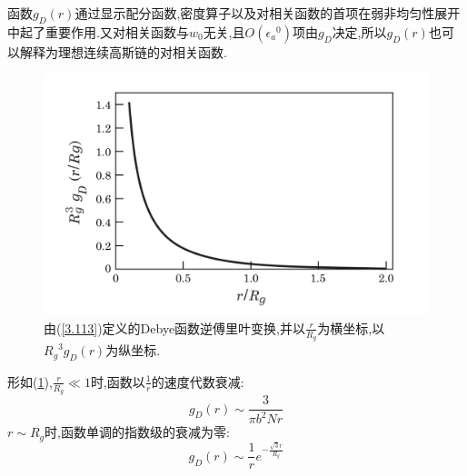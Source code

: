 函数$g_D(r)$通过显示配分函数,密度算子以及对相关函数的首项在弱非均匀性展开中起了重要作用.又对相关函数与$w_0$无关,且$O({\epsilon_a}^0)$项由$g_D$决定,所以$g_D(r)$也可以解释为理想连续高斯链的对相关函数.
\begin{figure}[H]
	\centering
	\includegraphics[scale=0.4]{./figures/FIG3-9.png}
	\caption{由(\ref{3.113})定义的Debye函数逆傅里叶变换,并以$\frac{r}{R_g}$为横坐标,以${R_g}^3 g_D(r)$为纵坐标.}
	\label{FIG3.9}
\end{figure}

形如(\ref{FIG3.9}),$\frac{r}{R_g} \ll 1$时,函数以$\frac{1}{r}$的速度代数衰减:
\begin{equation}
g_D(r) \sim \frac{3}{\pi b^2 N r}
\end{equation}
$r \sim R_g$时,函数单调的指数级的衰减为零:
$$g_D(r) \sim \frac{1}{r} e^{-\frac{\sqrt{3}r}{R_g}}$$

